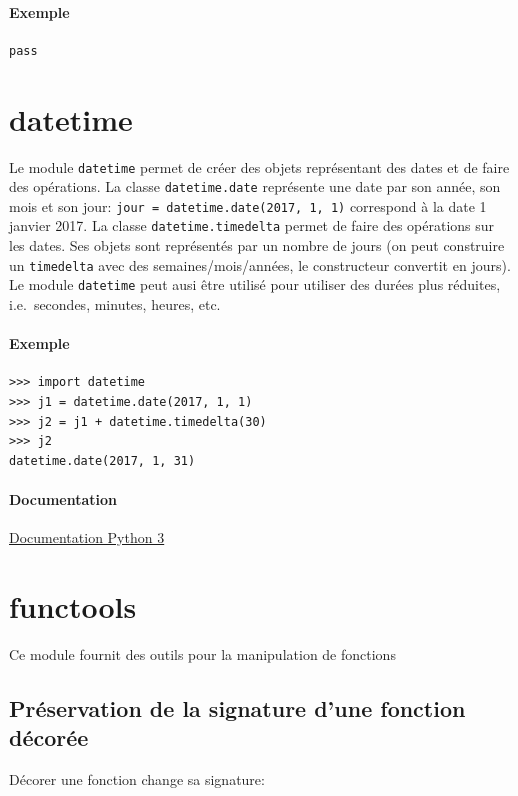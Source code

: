 \documentclass[a4paper, 10pt]{article}
\begin{document}
\paragraph{Exemple}
\begin{verbatim}
pass
\end{verbatim}



\section{datetime}\label{datetime}

Le module \texttt{datetime} permet de créer des objets représentant des dates et de faire des opérations. La classe \texttt{datetime.date} représente une date par son année, son mois et son jour: \texttt{jour = datetime.date(2017, 1, 1)} correspond à la date 1\ier{} janvier 2017.
La classe \texttt{datetime.timedelta} permet de faire des opérations sur les dates. Ses objets sont représentés par un nombre de jours (on peut construire un \texttt{timedelta} avec des semaines/mois/années, le constructeur convertit en jours).
Le module \texttt{datetime} peut ausi être utilisé pour utiliser des durées plus réduites, i.e.\ secondes, minutes, heures, etc.

\paragraph{Exemple}
\begin{verbatim}
>>> import datetime
>>> j1 = datetime.date(2017, 1, 1)
>>> j2 = j1 + datetime.timedelta(30)
>>> j2
datetime.date(2017, 1, 31)
\end{verbatim}


\paragraph*{Documentation} \href{https://docs.python.org/fr/3/library/datetime.html}{Documentation Python 3}

\section{functools}
Ce module fournit des outils pour la manipulation de fonctions

\subsection{Préservation de la signature d'une fonction décorée}
Décorer une fonction change sa signature:
\end{document}
